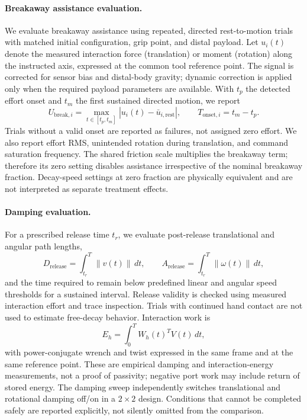 \paragraph{Breakaway assistance evaluation.}
We evaluate breakaway assistance using repeated, directed rest-to-motion
trials with matched initial configuration, grip point, and distal payload.
Let $u_i(t)$ denote the measured interaction force (translation) or moment
(rotation) along the instructed axis, expressed at the common tool reference
point. The signal is corrected for sensor bias and distal-body gravity;
dynamic correction is applied only when the required payload parameters are
available. With $t_p$ the detected effort onset and $t_m$ the first sustained
directed motion, we report
\begin{equation}
 U_{\mathrm{break},i}=\max_{t\in[t_p,t_m]}|u_i(t)-\bar u_{i,\mathrm{rest}}|,
 \qquad T_{\mathrm{onset},i}=t_m-t_p.
\end{equation}
Trials without a valid onset are reported as failures, not assigned zero effort.
We also report effort RMS, unintended rotation during translation, and command
saturation frequency. The shared friction scale multiplies the breakaway term;
therefore its zero setting disables assistance irrespective of the nominal
breakaway fraction. Decay-speed settings at zero fraction are physically
equivalent and are not interpreted as separate treatment effects.

\paragraph{Damping evaluation.}
For a prescribed release time $t_r$, we evaluate post-release translational
and angular path lengths,
\begin{equation}
 D_{\mathrm{release}}=\int_{t_r}^{T}\|v(t)\|\,dt,\qquad
 A_{\mathrm{release}}=\int_{t_r}^{T}\|\omega(t)\|\,dt,
\end{equation}
and the time required to remain below predefined linear and angular speed
thresholds for a sustained interval. Release validity is checked using measured
interaction effort and trace inspection. Trials with continued hand contact
are not used to estimate free-decay behavior. Interaction work is
\begin{equation}
 E_h=\int_0^T W_h(t)^T V(t)\,dt,
\end{equation}
with power-conjugate wrench and twist expressed in the same frame and at the
same reference point. These are empirical damping and interaction-energy
measurements, not a proof of passivity; negative port work may include return
of stored energy. The damping sweep independently switches translational and
rotational damping off/on in a $2\times2$ design. Conditions that cannot be
completed safely are reported explicitly, not silently omitted from the comparison.

